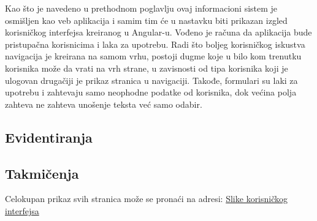 \documentclass[../main.tex]{subfiles}
\begin{document}
Kao što je navedeno u prethodnom poglavlju ovaj informacioni sistem je osmišljen kao veb aplikacija i samim tim će u nastavku biti prikazan izgled korisničkog interfejsa kreiranog u Angular-u.
Vođeno je računa da aplikacija bude pristupačna korisnicima i laka za upotrebu. Radi što boljeg korisničkog iskustva navigacija je kreirana na samom vrhu, postoji dugme koje u bilo kom trenutku korisnika može da vrati na vrh strane, u zavisnosti od tipa korisnika koji je ulogovan drugačiji je prikaz stranica u navigaciji. Takođe, formulari su laki za upotrebu i zahtevaju samo neophodne podatke od korisnika, dok većina polja zahteva ne zahteva unošenje teksta već samo odabir.

\subsection{Evidentiranja}


\subsection{Takmičenja}


Celokupan prikaz svih stranica može se pronaći na adresi: \href{https://github.com/jovanape/Informacioni-sistem-za-teretane/tree/main/screenshot-ovi_web_aplikacije}{Slike korisničkog interfejsa}
\end{document}
